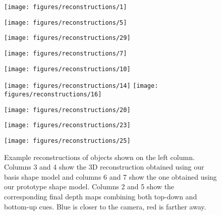 \begin{figure*}[htb!]
  \texttt{[image: figures/reconstructions/1]}
  

 
 \texttt{[image: figures/reconstructions/5]}    
 
 
\texttt{[image: figures/reconstructions/29]}

 \texttt{[image: figures/reconstructions/7]}
  

   \texttt{[image: figures/reconstructions/10]}
  

  
 \texttt{[image: figures/reconstructions/14]}
 \texttt{[image: figures/reconstructions/16]}
       

\texttt{[image: figures/reconstructions/20]}


\texttt{[image: figures/reconstructions/23]}

\texttt{[image: figures/reconstructions/25]}


\caption{\label{fig:recons}Example reconstructions of objects shown on the left column. Columns 3 and 4 show the 3D reconstruction obtained using our basis shape model and columns 6 and 7 show the one obtained using our prototype shape model. Columns 2 and 5 show the corresponding final depth maps combining both top-down and bottom-up cues. Blue is closer to the camera, red is farther away.}
\end{figure*}